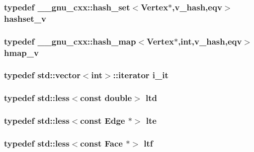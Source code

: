 \subsubsection{\setlength{\rightskip}{0pt plus 5cm}typedef \_\-\_\-gnu\_\-cxx::hash\_\-set$<${\bf Vertex}$\ast$,{\bf v\_\-hash},{\bf eqv}$>$ {\bf hashset\_\-v}}\label{meshmorph_8h_274b35739790732fd62f8771c082edb0}


\subsubsection{\setlength{\rightskip}{0pt plus 5cm}typedef \_\-\_\-gnu\_\-cxx::hash\_\-map$<${\bf Vertex}$\ast$,int,{\bf v\_\-hash},{\bf eqv}$>$ {\bf hmap\_\-v}}\label{meshmorph_8h_98cba187ef21b37be895460edbcbbe4d}


\subsubsection{\setlength{\rightskip}{0pt plus 5cm}typedef std::vector$<$int$>$::iterator {\bf i\_\-it}}\label{meshmorph_8h_8824401dc94595ec38aa0c359a8cf6c0}


\subsubsection{\setlength{\rightskip}{0pt plus 5cm}typedef std::less$<$const double$>$ {\bf ltd}}\label{meshmorph_8h_8395a7f9a95c868d9f7a2679b7b9c4c6}


\subsubsection{\setlength{\rightskip}{0pt plus 5cm}typedef std::less$<$const {\bf Edge} $\ast$$>$ {\bf lte}}\label{meshmorph_8h_d437f18aff14545bb2f4ba6bb223b9f9}


\subsubsection{\setlength{\rightskip}{0pt plus 5cm}typedef std::less$<$const {\bf Face} $\ast$$>$ {\bf ltf}}\label{meshmorph_8h_771fe55387804f93885e754766093f69}


